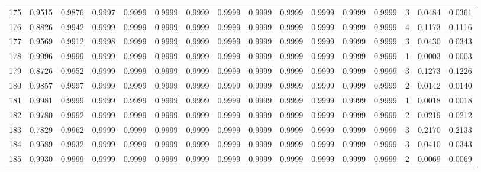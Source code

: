 \begin{tabular}{lrrrrrrrrrrrrrrr}
175 &      0.9515 &  0.9876 &  0.9997 &  0.9999 &  0.9999 &  0.9999 &  0.9999 &  0.9999 &  0.9999 &  0.9999 &   0.9999 &     0.9999 &      3 &                    0.0484 &                     0.0361 \\
176 &      0.8826 &  0.9942 &  0.9999 &  0.9999 &  0.9999 &  0.9999 &  0.9999 &  0.9999 &  0.9999 &  0.9999 &   0.9999 &     0.9999 &      4 &                    0.1173 &                     0.1116 \\
177 &      0.9569 &  0.9912 &  0.9998 &  0.9999 &  0.9999 &  0.9999 &  0.9999 &  0.9999 &  0.9999 &  0.9999 &   0.9999 &     0.9999 &      3 &                    0.0430 &                     0.0343 \\
178 &      0.9996 &  0.9999 &  0.9999 &  0.9999 &  0.9999 &  0.9999 &  0.9999 &  0.9999 &  0.9999 &  0.9999 &   0.9999 &     0.9999 &      1 &                    0.0003 &                     0.0003 \\
179 &      0.8726 &  0.9952 &  0.9999 &  0.9999 &  0.9999 &  0.9999 &  0.9999 &  0.9999 &  0.9999 &  0.9999 &   0.9999 &     0.9999 &      3 &                    0.1273 &                     0.1226 \\
180 &      0.9857 &  0.9997 &  0.9999 &  0.9999 &  0.9999 &  0.9999 &  0.9999 &  0.9999 &  0.9999 &  0.9999 &   0.9999 &     0.9999 &      2 &                    0.0142 &                     0.0140 \\
181 &      0.9981 &  0.9999 &  0.9999 &  0.9999 &  0.9999 &  0.9999 &  0.9999 &  0.9999 &  0.9999 &  0.9999 &   0.9999 &     0.9999 &      1 &                    0.0018 &                     0.0018 \\
182 &      0.9780 &  0.9992 &  0.9999 &  0.9999 &  0.9999 &  0.9999 &  0.9999 &  0.9999 &  0.9999 &  0.9999 &   0.9999 &     0.9999 &      2 &                    0.0219 &                     0.0212 \\
183 &      0.7829 &  0.9962 &  0.9999 &  0.9999 &  0.9999 &  0.9999 &  0.9999 &  0.9999 &  0.9999 &  0.9999 &   0.9999 &     0.9999 &      3 &                    0.2170 &                     0.2133 \\
184 &      0.9589 &  0.9932 &  0.9999 &  0.9999 &  0.9999 &  0.9999 &  0.9999 &  0.9999 &  0.9999 &  0.9999 &   0.9999 &     0.9999 &      3 &                    0.0410 &                     0.0343 \\
185 &      0.9930 &  0.9999 &  0.9999 &  0.9999 &  0.9999 &  0.9999 &  0.9999 &  0.9999 &  0.9999 &  0.9999 &   0.9999 &     0.9999 &      2 &                    0.0069 &                     0.0069 \\

\end{tabular}
